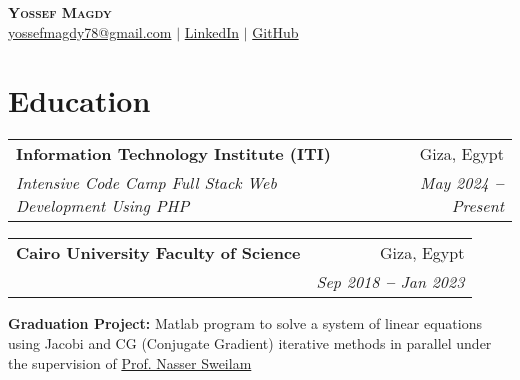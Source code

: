 \documentclass[letterpaper,11pt]{article}
\makeatletter
\newcommand{\resumeSubheading}[4]{
  \vspace{-2pt}\item
    \begin{tabular*}{0.97\textwidth}[t]{l@{\extracolsep{\fill}}r}
      \textbf{#1} & #2 \\
      \textit{\small#3} & \textit{\small #4} \\
    \end{tabular*}\vspace{-7pt}
}
\newcommand{\resumeSubHeadingListStart}{\begin{itemize}[leftmargin=0.15in, label={}]}
\newcommand{\resumeSubHeadingListEnd}{\end{itemize}}
\makeatother
\begin{document}

\begin{center}
    \textbf{\Huge \scshape Yossef Magdy} \\ \vspace{3pt}
    \small
	\faEnvelope \hspace{.5pt} \href{mailto:yossefmagdy78@gmail.com}{yossefmagdy78@gmail.com}
   	$|$
	\faLinkedinSquare \hspace{.5pt} \href{https://www.linkedin.com/in/yossef-magdy}{LinkedIn}
    $|$
    \faGithub \hspace{.5pt} \href{https://github.com/yossef-magdy}{GitHub}
    
\end{center}




\section{Education}
  \vspace{3pt}
  \resumeSubHeadingListStart
    
    \resumeSubheading
	{Information Technology Institute (ITI)}{Giza, Egypt}
	{Intensive Code Camp Full Stack Web Development Using PHP }{May 2024 \textbf{--} Present}
    
    \resumeSubheading
    {Cairo University Faculty of Science}{Giza, Egypt}
    {B.Sc. in Computer Science   \textbf}{Sep 2018 \textbf{--} Jan 2023}
    \resumeSubHeadingListStart
    \small{
    	\item{
    	\textbf{Graduation Project:}
    		Matlab program to solve a system of linear equations using Jacobi and CG (Conjugate Gradient) iterative methods in parallel under the supervision of \href{https://eg.linkedin.com/in/nasser-sweilam-08340141}{\color{blue} Prof. Nasser Sweilam}
      	}
    }
    \resumeSubHeadingListEnd

    
  \resumeSubHeadingListEnd



\end{document}

